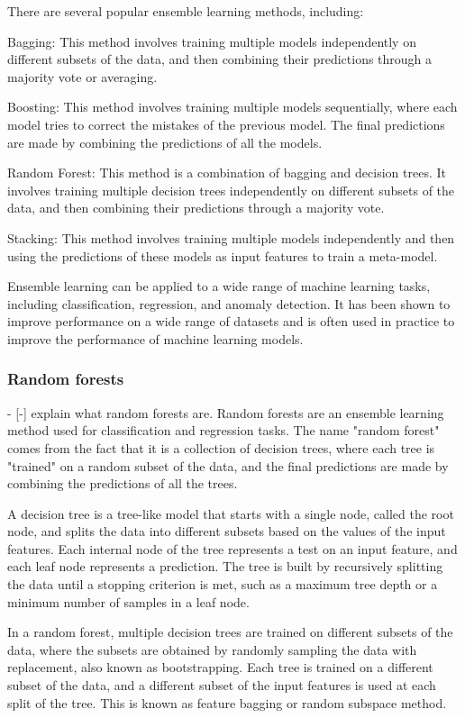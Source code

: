 There are several popular ensemble learning methods, including:

Bagging: This method involves training multiple models independently on different subsets of the data, and then combining their predictions through a majority vote or averaging.

Boosting: This method involves training multiple models sequentially, where each model tries to correct the mistakes of the previous model. The final predictions are made by combining the predictions of all the models.

Random Forest: This method is a combination of bagging and decision trees. It involves training multiple decision trees independently on different subsets of the data, and then combining their predictions through a majority vote.

Stacking: This method involves training multiple models independently and then using the predictions of these models as input features to train a meta-model.

Ensemble learning can be applied to a wide range of machine learning tasks, including classification, regression, and anomaly detection. It has been shown to improve performance on a wide range of datasets and is often used in practice to improve the performance of machine learning models.


\subsubsection{Random forests}
- [-] explain what random forests are.
Random forests are an ensemble learning method used for classification and regression tasks. The name "random forest" comes from the fact that it is a collection of decision trees, where each tree is "trained" on a random subset of the data, and the final predictions are made by combining the predictions of all the trees.

A decision tree is a tree-like model that starts with a single node, called the root node, and splits the data into different subsets based on the values of the input features. Each internal node of the tree represents a test on an input feature, and each leaf node represents a prediction. The tree is built by recursively splitting the data until a stopping criterion is met, such as a maximum tree depth or a minimum number of samples in a leaf node.

In a random forest, multiple decision trees are trained on different subsets of the data, where the subsets are obtained by randomly sampling the data with replacement, also known as bootstrapping. Each tree is trained on a different subset of the data, and a different subset of the input features is used at each split of the tree. This is known as feature bagging or random subspace method.

